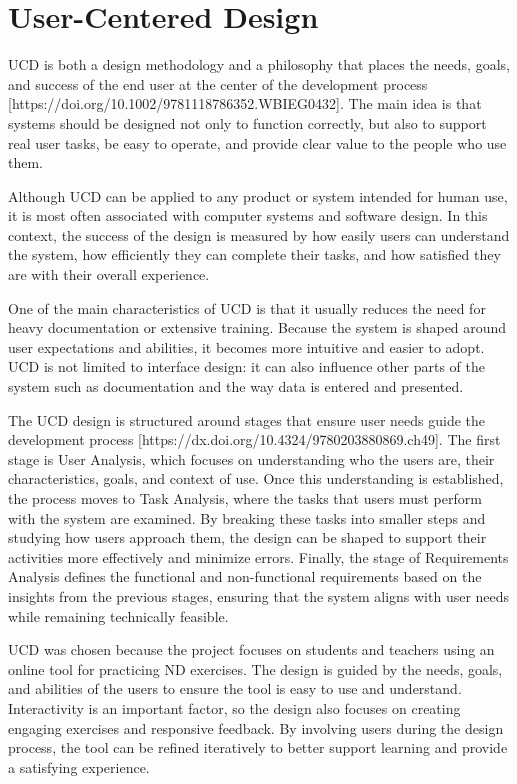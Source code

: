 \section{User-Centered Design}
\gls{UCD} is both a design methodology and a philosophy that places the needs, goals, and success of the end user at the center of the development process [https://doi.org/10.1002/9781118786352.WBIEG0432]. The main idea is that systems should be designed not only to function correctly, but also to support real user tasks, be easy to operate, and provide clear value to the people who use them.

Although \gls{UCD} can be applied to any product or system intended for human use, it is most often associated with computer systems and software design. In this context, the success of the design is measured by how easily users can understand the system, how efficiently they can complete their tasks, and how satisfied they are with their overall experience.

One of the main characteristics of \gls{UCD} is that it usually reduces the need for heavy documentation or extensive training. Because the system is shaped around user expectations and abilities, it becomes more intuitive and easier to adopt. \gls{UCD} is not limited to interface design: it can also influence other parts of the system such as documentation and the way data is entered and presented.

The \gls{UCD} design is structured around stages that ensure user needs guide the development process [https://dx.doi.org/10.4324/9780203880869.ch49]. The first stage is User Analysis, which focuses on understanding who the users are, their characteristics, goals, and context of use. Once this understanding is established, the process moves to Task Analysis, where the tasks that users must perform with the system are examined. By breaking these tasks into smaller steps and studying how users approach them, the design can be shaped to support their activities more effectively and minimize errors. Finally, the stage of Requirements Analysis defines the functional and non-functional requirements based on the insights from the previous stages, ensuring that the system aligns with user needs while remaining technically feasible.

\gls{UCD} was chosen because the project focuses on students and teachers using an online tool for practicing \gls{ND} exercises. The design is guided by the needs, goals, and abilities of the users to ensure the tool is easy to use and understand. Interactivity is an important factor, so the design also focuses on creating engaging exercises and responsive feedback. By involving users during the design process, the tool can be refined iteratively to better support learning and provide a satisfying experience.

